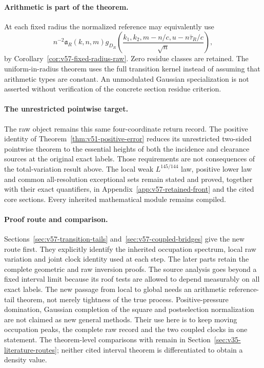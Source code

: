 \documentclass[11pt,reqno]{amsart}
\numberwithin{equation}{section}
\theoremstyle{definition}\newtheorem{definition}[theorem]{Definition}
\theoremstyle{remark}\newtheorem{remark}[theorem]{Remark}
\begin{document}
\paragraph{Arithmetic is part of the theorem.}
At each fixed radius the normalized reference may equivalently use
\[
 n^{-2}\mathfrak a_R(k,n,m)g_{D_R}
  \left(\frac{k_1,k_2,m-n/c,u-n\bar\tau_R/c}{\sqrt n}\right),
\]
by Corollary~\ref{cor:v57-fixed-radius-raw}. Zero residue classes are
retained. The uniform-in-radius theorem uses the full transition
kernel instead of assuming that arithmetic types are constant.
An unmodulated Gaussian specialization is not asserted without
verification of the concrete section residue criterion.

\paragraph{The unrestricted pointwise target.}
The raw object remains this same four-coordinate return record. The
positive identity of Theorem~\ref{thm:v51-positive-error} reduces its
unrestricted two-sided pointwise theorem to the essential heights of
both the incidence and clearance sources at the original exact labels.
Those requirements are not consequences of the total-variation result
above. The local weak $L^{145/144}$ law, positive lower law and common
all-resolution exceptional sets remain stated and proved, together
with their exact quantifiers, in
Appendix~\ref{app:v57-retained-front} and the cited core sections.
Every inherited mathematical module remains compiled.

\paragraph{Proof route and comparison.}
Sections~\ref{sec:v57-transition-tails} and~\ref{sec:v57-coupled-bridges}
give the new route first. They explicitly identify the inherited
occupation spectrum, local raw variation and joint clock identity used
at each step. The later parts retain the complete geometric and raw
inversion proofs. The source analysis goes beyond a fixed interval
limit because its roof tests are allowed to depend measurably on all
exact labels. The new passage from local to global needs an arithmetic
reference-tail theorem, not merely tightness of the true process.
Positive-pressure domination, Gaussian completion of the square and
postselection normalization are not claimed as new general methods.
Their use here is to keep moving occupation peaks, the complete raw
record and the two coupled clocks in one statement. The theorem-level
comparisons with \cite{DPZ,DN} remain in
Section~\ref{sec:v35-literature-routes}; neither cited interval theorem
is differentiated to obtain a density value.
\end{document}
